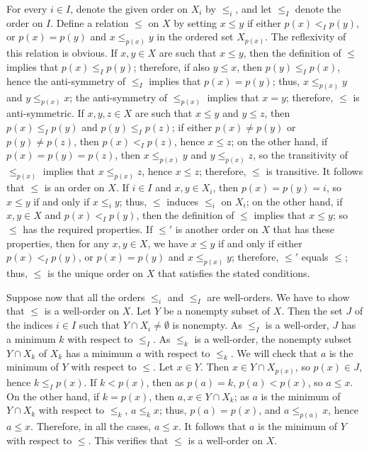\documentclass{article}
\begin{document}
\begin{solution}[\ref{exe:rw9lhmv9}]
  \label{sol:dcd6z7iz}
  For every \(i \in I\), denote the given order on \(X_i\) by
  \(\leq_i\), and let \(\leq_I\) denote the order on \(I\).  Define a
  relation \(\leq\) on \(X\) by setting \(x \leq y\) if either
  \(p(x) <_I p(y)\), or \(p(x) = p(y)\) and \(x \leq_{p(x)} y\) in the
  ordered set \(X_{p(x)}\).  The reflexivity of this relation is
  obvious.  If \(x, y \in X\) are such that \(x \leq y\), then the
  definition of \(\leq\) implies that \(p(x) \leq_I p(y)\); therefore,
  if also \(y \leq x\), then \(p(y) \leq_I p(x)\), hence the
  anti-symmetry of \(\leq_I\) implies that \(p(x) = p(y)\); thus,
  \(x \leq_{p(x)} y\) and \(y \leq_{p(x)} x\); the anti-symmetry of
  \(\leq_{p(x)}\) implies that \(x = y\); therefore, \(\leq\) is
  anti-symmetric.  If \(x, y, z \in X\) are such that \(x \leq y\) and
  \(y \leq z\), then \(p(x) \leq_I p(y)\) and \(p(y) \leq_I p(z)\); if
  either \(p(x) \neq p(y)\) or \(p(y) \neq p(z)\), then
  \(p(x) <_I p(z)\), hence \(x \leq z\); on the other hand, if
  \(p(x) = p(y) = p(z)\), then \(x \leq_{p(x)} y\) and
  \(y \leq_{p(x)} z\), so the transitivity of \(\leq_{p(x)}\) implies
  that \(x \leq_{p(x)} z\), hence \(x \leq z\); therefore, \(\leq\) is
  transitive.  It follows that \(\leq\) is an order on \(X\).  If
  \(i \in I\) and \(x, y \in X_i\), then \(p(x) = p(y) = i\), so
  \(x \leq y\) if and only if \(x \leq_i y\); thus, \(\leq\) induces
  \(\leq_i\) on \(X_i\); on the other hand, if \(x, y \in X\) and
  \(p(x) <_I p(y)\), then the definition of \(\leq\) implies that
  \(x \leq y\); so \(\leq\) has the required properties.  If \(\leq'\)
  is another order on \(X\) that has these properties, then for any
  \(x, y \in X\), we have \(x \leq y\) if and only if either
  \(p(x) <_I p(y)\), or \(p(x) = p(y)\) and \(x \leq_{p(x)} y\);
  therefore, \(\leq'\) equals \(\leq\); thus, \(\leq\) is the unique
  order on \(X\) that satisfies the stated conditions.

  Suppose now that all the orders \(\leq_i\) and \(\leq_I\) are
  well-orders.  We have to show that \(\leq\) is a well-order on
  \(X\).  Let \(Y\) be a nonempty subset of \(X\).  Then the set \(J\)
  of the indices \(i \in I\) such that \(Y \cap X_i \neq \emptyset\)
  is nonempty.  As \(\leq_I\) is a well-order, \(J\) has a minimum
  \(k\) with respect to \(\leq_I\).  As \(\leq_k\) is a well-order,
  the nonempty subset \(Y \cap X_k\) of \(X_k\) has a minimum \(a\)
  with respect to \(\leq_k\).  We will check that \(a\) is the minimum
  of \(Y\) with respect to \(\leq\).  Let \(x \in Y\).  Then
  \(x \in Y \cap X_{p(x)}\), so \(p(x) \in J\), hence
  \(k \leq_I p(x)\).  If \(k < p(x)\), then as \(p(a) = k\),
  \(p(a) < p(x)\), so \(a \leq x\).  On the other hand, if
  \(k = p(x)\), then \(a, x \in Y \cap X_k\); as \(a\) is the minimum
  of \(Y \cap X_k\) with respect to \(\leq_k\), \(a \leq_k x\); thus,
  \(p(a) = p(x)\), and \(a \leq_{p(a)} x\), hence \(a \leq x\).
  Therefore, in all the cases, \(a \leq x\).  It follows that \(a\) is
  the minimum of \(Y\) with respect to \(\leq\).  This verifies that
  \(\leq\) is a well-order on \(X\).
\end{solution}
\end{document}
